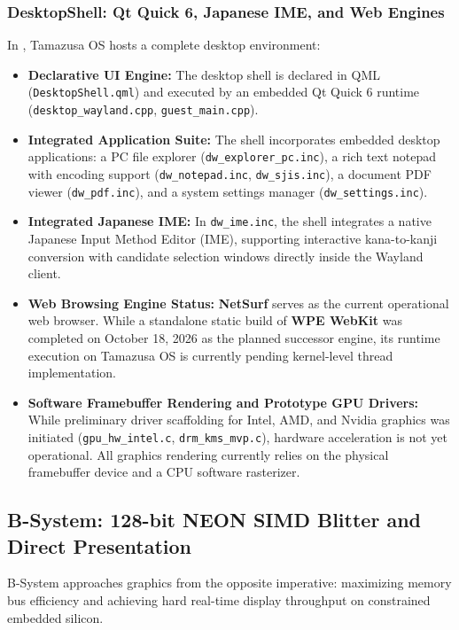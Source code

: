 \documentclass[10pt,journal,compsoc,twocolumn]{article}
\begin{document}
\subsubsection{DesktopShell: Qt Quick 6, Japanese IME, and Web Engines}
In , Tamazusa OS hosts a complete desktop environment:
\begin{itemize}[leftmargin=*]
    \item \textbf{Declarative UI Engine:} The desktop shell is declared in QML (\texttt{DesktopShell.qml}) and executed by an embedded Qt Quick 6 runtime (\texttt{desktop\_wayland.cpp}, \texttt{guest\_main.cpp}).
    \item \textbf{Integrated Application Suite:} The shell incorporates embedded desktop applications: a PC file explorer (\texttt{dw\_explorer\_pc.inc}), a rich text notepad with encoding support (\texttt{dw\_notepad.inc}, \texttt{dw\_sjis.inc}), a document PDF viewer (\texttt{dw\_pdf.inc}), and a system settings manager (\texttt{dw\_settings.inc}).
    \item \textbf{Integrated Japanese IME:} In \texttt{dw\_ime.inc}, the shell integrates a native Japanese Input Method Editor (IME), supporting interactive kana-to-kanji conversion with candidate selection windows directly inside the Wayland client.
    \item \textbf{Web Browsing Engine Status:} \textbf{NetSurf} serves as the current operational web browser. While a standalone static build of \textbf{WPE WebKit} was completed on October 18, 2026 as the planned successor engine, its runtime execution on Tamazusa OS is currently pending kernel-level thread implementation.
    \item \textbf{Software Framebuffer Rendering and Prototype GPU Drivers:} While preliminary driver scaffolding for Intel, AMD, and Nvidia graphics was initiated (\texttt{gpu\_hw\_intel.c}, \texttt{drm\_kms\_mvp.c}), hardware acceleration is not yet operational. All graphics rendering currently relies on the physical framebuffer device and a CPU software rasterizer.
\end{itemize}

\subsection{B-System: 128-bit NEON SIMD Blitter and Direct Presentation}
B-System approaches graphics from the opposite imperative: maximizing memory bus efficiency and achieving hard real-time display throughput on constrained embedded silicon.
\end{document}
